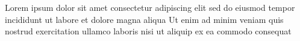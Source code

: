 Lorem ipsum dolor sit amet
consectetur adipiscing elit
sed do eiusmod tempor incididunt 
ut labore et dolore magna aliqua 
Ut enim ad minim veniam
quis nostrud exercitation 
ullamco laboris nisi ut 
aliquip ex ea commodo consequat